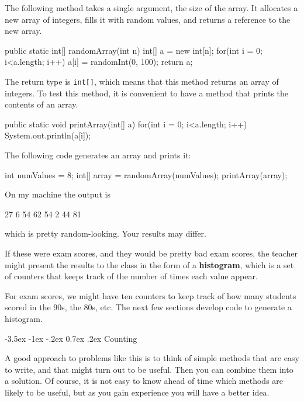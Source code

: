 \documentclass{book}
\makeatletter
\renewcommand{\section}{\@startsection 
    {section} {1} {0mm}%
    {-3.5ex \@plus -1ex \@minus -.2ex}%
    {0.7ex \@plus.2ex}%
    {\normalfont\Large\bfseries}}
\makeatother
\begin{document}
The following method takes a single argument, the size of
the array.  It allocates a new array of integers, fills
it with random values, and returns a reference to the new
array.

\begin{verbatimtab}
  public static int[] randomArray(int n) {
    int[] a = new int[n];
    for(int i = 0; i<a.length; i++) {
      a[i] = randomInt(0, 100);
    }
    return a;
  }
\end{verbatimtab}
%
The return type is {\tt int[]}, which means that
this method returns an array of integers.
To test this method, it is convenient to have a method that
prints the contents of an array.

\begin{verbatimtab}
  public static void printArray(int[] a) {
    for(int i = 0; i<a.length; i++) {
      System.out.println(a[i]);
    }
  }
\end{verbatimtab}
%
The following code generates an array and prints it:

\begin{verbatimtab}
    int numValues = 8;
    int[] array = randomArray(numValues);
    printArray(array);
\end{verbatimtab}
%
On my machine the output is

\begin{verbatimtab}
27
6
54
62
54
2
44
81
\end{verbatimtab}
%
which is pretty random-looking.  Your results may differ.

If these were exam scores, and they would be pretty bad exam
scores, the teacher might present the results to the class
in the form of a {\bf histogram}, which is a set of counters
that keeps track of the number of times each value appear.


For exam scores, we might have ten counters to keep track of
how many students scored in the 90s, the 80s, etc.  The next
few sections develop code to generate a histogram.


\section{Counting}

A good approach to problems like this is to think of simple methods
that are easy to write, and that might turn out to be useful.  Then
you can combine them into a solution.  Of course, it is not easy to
know ahead of time which methods are likely to be useful, but as you
gain experience you will have a better idea.
\end{document}
